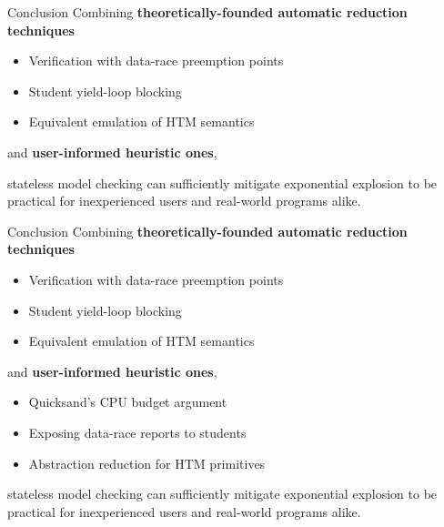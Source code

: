 \documentclass[xcolor=dvipsnames]{beamer}
\newcommand\hilight[2]{\color{#1}#2\color{black}}
\begin{document}
\begin{frame}{Conclusion}
	Combining %
	{\bf theoretically-founded automatic reduction techniques}
	\begin{itemize}
		\item \hilight{sect-quicksand}{Verification with data-race preemption points}
		\item \hilight{sect-410}{Student yield-loop blocking} %
		\item \hilight{sect-htm}{Equivalent emulation of HTM semantics}
	\end{itemize}
	and {\bf user-informed heuristic ones},
	\vspace{4.82em}
	\linegap

	\hilight{gray}{stateless model checking}\xspace
	\hilight{sect-pastel-quicksand}{can sufficiently mitigate exponential explosion}\xspace
	\hilight{sect-pastel-410}{to be practical for inexperienced users}\xspace
	\hilight{sect-pastel-htm}{and real-world programs alike.}\xspace
\end{frame}
\begin{frame}{Conclusion}
	Combining %
	{\bf theoretically-founded automatic reduction techniques}
	\begin{itemize}
		\item \hilight{sect-quicksand}{Verification with data-race preemption points}
		\item \hilight{sect-410}{Student yield-loop blocking} %
		\item \hilight{sect-htm}{Equivalent emulation of HTM semantics}
	\end{itemize}
	and {\bf user-informed heuristic ones},
	\begin{itemize}
		\item \hilight{sect-quicksand}{Quicksand's CPU budget argument}
		\item \hilight{sect-410}{Exposing data-race reports to students}
		\item \hilight{sect-htm}{Abstraction reduction for HTM primitives}
	\end{itemize}
	\linegap

	\hilight{gray}{stateless model checking}\xspace
	\hilight{sect-pastel-quicksand}{can sufficiently mitigate exponential explosion}\xspace
	\hilight{sect-pastel-410}{to be practical for inexperienced users}\xspace
	\hilight{sect-pastel-htm}{and real-world programs alike.}\xspace
\end{frame}
\end{document}
